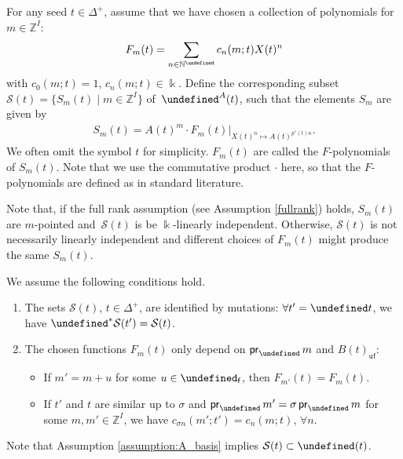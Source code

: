 \documentclass[10pt,a4paper]{amsart}
\newcommand{\kk}{\Bbbk}
\newcommand{\Z}{\mathbb{Z}}
\newcommand{\N}{\mathbb{N}}
\newcommand{\opname}[1]{\operatorname{\mathsf{#1}}}
\newcommand{\pr}{\opname{pr}}
\newcommand{\cS}{{\mathcal S}}
\newcommand{\fv}{\opname{f}}
\newcommand{\ufv}{\opname{uf}}
\let\Mc\undefined
\let\Iufv\undefined
\let\upClAlg\undefined
\let\LP\undefined
\let\seq\undefined
\newcommand{\Mc}{M^\circ}
\newcommand{\Iufv}{I_{\ufv}}
\newcommand{\upClAlg}{\mathcal{U}^A}
\newcommand{\LP}{{\mathcal{LP}}}
\newcommand{\seq}{\boldsymbol{\mu}}%
\numberwithin{equation}{section}
\begin{document}
For any seed $t\in \Delta^+$, assume that we have chosen a collection of polynomials for $m\in \Z^I$: \[F_{m}(t)=\sum_{n\in\N^{\Iufv}}c_{n}(m;t)X(t)^{n}\]
with $c_{0}(m;t)=1$, $c_{n}(m;t)\in\kk$. Define the corresponding subset $\cS(t)=\big\{S_{m}(t)\mid m\in\Z^I\big\}$
of~$\LP^{A}(t)$, such that the elements $S_{m}$ are given by
\begin{align*}S_{m}(t)=A(t)^{m}\cdot F_{m}(t)|_{X(t)^n\mapsto A(t)^{p^{*}(t)n}}.\end{align*}
We often omit the symbol $t$ for simplicity. $F_m(t)$ are called the $F$-polynomials of $S_m(t)$. Note that we use the commutative product $\cdot$ here, so that the $F$-polynomials are defined as in standard literature.

Note that, if the full rank assumption (see Assumption \ref{fullrank}) holds, $S_m(t)$ are $m$-pointed and~$\cS(t)$ is
be $\kk$-linearly independent. Otherwise, $\cS(t)$ is not necessarily linearly independent and different choices of $F_m(t)$ might produce the same $S_m(t)$.

\begin{Assumption}\label{assumption:A_basis}
 We assume the following conditions hold.
\begin{enumerate}\itemsep=0pt
\item[(1)] The sets $\cS(t)$, $t\in\Delta^{+}$, are identified by mutations: $\forall t'=\seq t$, we have $\seq^{*}\cS(t')=\cS(t)$.

\item[(2)] The chosen functions $F_{m}(t)$ only depend on $\pr_{\Iufv}m$ and $B(t)_{\ufv}$:
\begin{itemize}\itemsep=0pt
\item If $m'=m+u$ for some $u\in\Mc_{\fv}$, then $F_{m'}(t)=F_{m}(t)$.
\item If $t'$ and $t$ are similar up to $\sigma$ and $\pr_{\Iufv}m'=\sigma\pr_{\Iufv}m$
for some $m,m'\in\Z^{I}$, we have $c_{\sigma n}(m';t')=c_{n}(m;t)$,
$\forall n$.
\end{itemize}
\end{enumerate}
\end{Assumption}
Note that Assumption \ref{assumption:A_basis} implies $\cS(t)\subset\upClAlg(t)$.
\end{document}
